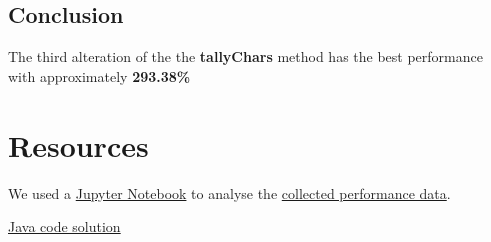\documentclass[a4paper,11pt]{article}
\theoremstyle{mytheor}
\begin{document}
\subsection*{Conclusion}

The third alteration of the the \textbf{tallyChars} method has the best performance with approximately \textbf{293.38\%}

\section*{Resources}
We used a \href{https://github.com/Soft20/UFO-Assignment-2/blob/main/src/analysis/notebook.ipynb}{Jupyter Notebook} to analyse the \href{https://github.com/Soft20/UFO-Assignment-2/blob/main/src/analysis/observations.csv}{collected performance data}.

\noindent \href{https://github.com/Soft20/UFO-Assignment-2/blob/main/src/main/java/cphbusiness/ufo/letterfrequencies/Main.java}{Java code solution}
\end{document}
